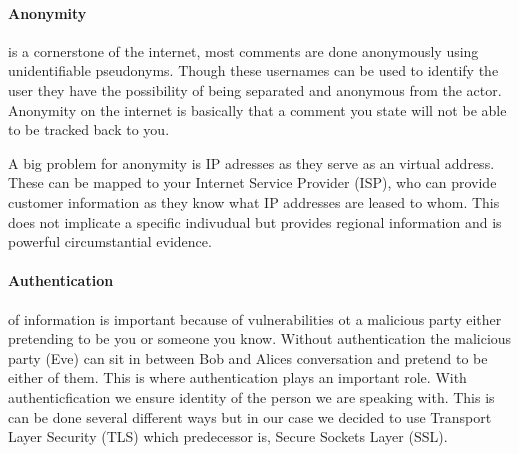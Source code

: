 \paragraph{Anonymity}
is a cornerstone of the internet, most comments are done
anonymously using unidentifiable pseudonyms. Though these usernames
can be used to identify the user they have the possibility of being
separated and anonymous from the actor. Anonymity on the internet is
basically that a comment you state will not be able to be tracked back
to you.

A big problem for anonymity is IP adresses as they serve as an virtual
address. These can be mapped to your Internet Service Provider (ISP),
who can provide customer information as they know what IP addresses
are leased to whom. This does not implicate a specific indivudual but
provides regional information and is powerful circumstantial
evidence.

\paragraph{Authentication}of information is important because of
vulnerabilities ot a malicious party either pretending to be you or
someone you know. Without authentication the malicious party (Eve) can
sit in between Bob and Alices conversation and pretend to be either of
them. This is where authentication plays an important role. With
authenticfication we ensure identity of the person we are speaking
with. This is can be done several different ways but in our case we
decided to use Transport Layer Security (TLS) which predecessor is,
Secure Sockets Layer (SSL).


